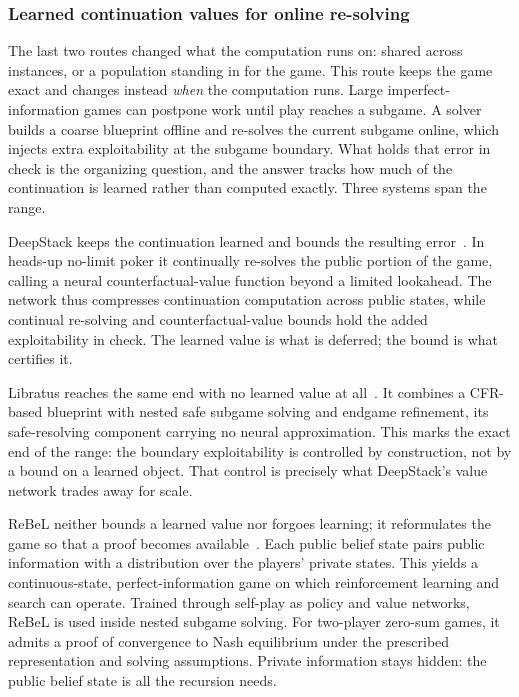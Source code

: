 \subsubsection{Learned continuation values for online re-solving}
The last two routes changed what the computation runs on: shared across
instances, or a population standing in for the game. This route keeps the game exact
and changes instead \emph{when} the computation runs. Large imperfect-information
games can postpone work until play reaches a subgame. A solver builds a coarse
blueprint offline and re-solves the current subgame online, which injects extra
exploitability at the subgame boundary. What holds that error in check is the
organizing question, and the answer tracks how much of the continuation is learned
rather than computed exactly. Three systems span the range.

 DeepStack keeps the continuation learned and bounds
the resulting error~\citep{Moravcik2017}. In heads-up no-limit poker it continually
re-solves the public portion of the game, calling a neural counterfactual-value
function beyond a limited lookahead. The network thus compresses continuation
computation across public states, while continual re-solving and
counterfactual-value bounds hold the added exploitability in check. The learned
value is what is deferred; the bound is what certifies it.

 Libratus reaches the same end with no learned value
at all~\citep{BrownSandholm2018}. It combines a CFR-based blueprint with nested safe
subgame solving and endgame refinement, its safe-resolving component carrying no
neural approximation. This marks the exact end of the range: the boundary
exploitability is controlled by construction, not by a bound on a learned object.
That control is precisely what DeepStack's value network trades away for scale.

 ReBeL neither bounds a learned value
nor forgoes learning; it reformulates the game so that a proof becomes
available~\citep{BrownReBeL2020}. Each public belief state pairs public information
with a distribution over the players' private states. This yields a
continuous-state, perfect-information game on which reinforcement learning and
search can operate. Trained through self-play as policy and value networks, ReBeL is
used inside nested subgame solving. For two-player zero-sum games, it admits a proof
of convergence to Nash equilibrium under the prescribed representation and solving
assumptions. Private information stays hidden: the public belief state is all the
recursion needs.

